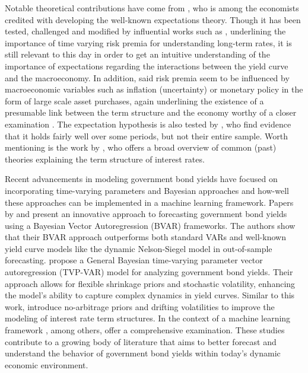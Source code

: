 


Notable theoretical contributions have come from \citet{hicks1946value}, who is among the economists credited with developing the well-known expectations theory.
Though it has been tested, challenged and modified by influential works such as \citet{campbell1991yield}, underlining the importance of time varying risk premia for understanding long-term rates, it is still relevant to this day in order to  get an intuitive understanding of the importance of expectations regarding the interactions between the yield curve and the macroeconomy.
In addition, said risk premia seem to be influenced by macroeconomic variables such as inflation (uncertainty) or monetary policy in the form of large scale asset purchases, again underlining the existence of a presumable link between the term structure and the economy worthy of a closer examination \citep{Gürkaynak_Wright_2012}. 
The expectation hypothesis is also tested by \citet{diebold2006macroeconomy}, who find evidence that it holds fairly well over some periods, but not their entire sample. 
Worth mentioning is the work by \citet{kessel1971cyclical}, who offers a broad overview of common (past) theories explaining the term structure of interest rates.

Recent advancements in modeling government bond yields have focused on incorporating time-varying parameters and Bayesian approaches and how-well these approaches can be implemented in a machine learning framework.
Papers by \citet{Carriero_2011} and \citet{CARRIERO20122026} present an innovative approach to forecasting government bond yields using a Bayesian Vector Autoregression (BVAR) frameworks. 
The authors show that their BVAR approach outperforms both standard VARs and well-known yield curve models like the dynamic Nelson-Siegel model in out-of-sample forecasting.  
\citet{Fischer_et_al_2023} propose a General Bayesian time-varying parameter vector autoregression (TVP-VAR) model for analyzing government bond yields. Their approach allows for flexible shrinkage priors and stochastic volatility, enhancing the model's ability to capture complex dynamics in yield curves. 
Similar to this work, \citet{Carriero_et_al_2021} introduce no-arbitrage priors and drifting volatilities to improve the modeling of interest rate term structures. 
In the context of a machine learning framework \citet{pedersen2019survey}, among others, offer a comprehensive examination. 
These studies contribute to a growing body of literature that aims to better forecast and understand the behavior of government bond yields within today's dynamic economic environment. 
